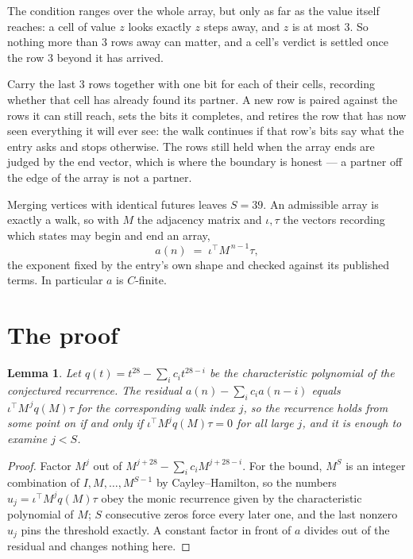 \documentclass[11pt,a4paper]{article}
\theoremstyle{plain}
\newtheorem{lemma}[theorem]{Lemma}
\theoremstyle{definition}
\begin{document}
The condition ranges over the whole array, but only as far as the value itself reaches: a cell of value $z$ looks exactly $z$ steps away, and $z$ is at most $3$. So nothing more than $3$ rows away can matter, and a cell's verdict is settled once the row $3$ beyond it has arrived.

Carry the last $3$ rows together with one bit for each of their cells, recording whether that cell has already found its partner. A new row is paired against the rows it can still reach, sets the bits it completes, and retires the row that has now seen everything it will ever see: the walk continues if that row's bits say what the entry asks and stops otherwise. The rows still held when the array ends are judged by the end vector, which is where the boundary is honest --- a partner off the edge of the array is not a partner.

Merging vertices with identical futures leaves $S=39$. An admissible array is exactly a walk, so with $M$ the adjacency matrix and $\iota,\tau$ the vectors recording which states may begin and end an array,
\[
a(n)\;=\;\iota^{\!\top}M^{\,n-1}\tau ,
\]
the exponent fixed by the entry's own shape and checked against its published terms. In
particular $a$ is $C$-finite.

\section{The proof}

\begin{lemma}\label{lem:crit}
Let $q(t)=t^{28}-\sum_i c_it^{28-i}$ be the characteristic polynomial of the
conjectured recurrence. The residual $a(n)-\sum_ic_ia(n-i)$ equals
$\iota^{\!\top}M^{\,j}q(M)\tau$ for the corresponding walk index $j$, so the recurrence
holds from some point on if and only if $\iota^{\!\top}M^{j}q(M)\tau=0$ for all large $j$,
and it is enough to examine $j<S$.
\end{lemma}

\begin{proof}
Factor $M^{j}$ out of $M^{j+28}-\sum_ic_iM^{j+28-i}$. For the bound, $M^{S}$
is an integer combination of $I,M,\dots,M^{S-1}$ by Cayley--Hamilton, so the numbers
$u_j=\iota^{\!\top}M^{j}q(M)\tau$ obey the monic recurrence given by the characteristic
polynomial of $M$; $S$ consecutive zeros force every later one, and the last nonzero $u_j$
pins the threshold exactly. A constant factor in front of $a$ divides out of the residual and
changes nothing here.
\end{proof}
\end{document}
